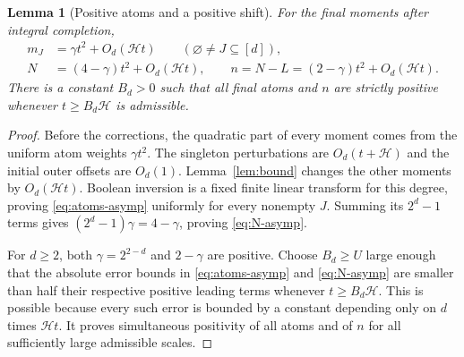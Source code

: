 \documentclass[11pt,a4paper]{article}
\newtheorem{lemma}[theorem]{Lemma}
\theoremstyle{definition}
\newcommand{\htf}{\mathcal H}
\newcommand{\wt}{\gamma}
\begin{document}
\begin{lemma}[Positive atoms and a positive shift]\label{lem:positive}
For the final moments after integral completion,
\begin{align}
 m_J&=\wt t^2+O_d(\htf t)\qquad(\varnothing\ne J\subseteq[d]),
     \label{eq:atoms-asymp}\\
 N&=(4-\wt)t^2+O_d(\htf t),\qquad
 n=N-L=(2-\wt)t^2+O_d(\htf t).\label{eq:N-asymp}
\end{align}
There is a constant $B_d>0$ such that all final atoms and $n$ are
strictly positive whenever $t\ge B_d\htf$ is admissible.
\end{lemma}
\begin{proof}
Before the corrections, the quadratic part of every moment comes from
the uniform atom weights $\wt t^2$. The singleton perturbations are
$O_d(t+\htf)$ and the initial outer offsets are $O_d(1)$.
Lemma~\ref{lem:bound} changes the other moments by
$O_d(\htf t)$. Boolean inversion is a fixed finite linear transform
for this degree, proving \eqref{eq:atoms-asymp} uniformly for every
nonempty $J$. Summing its $2^d-1$ terms gives
$(2^d-1)\wt=4-\wt$, proving \eqref{eq:N-asymp}.

For $d\ge2$, both $\wt=2^{2-d}$ and $2-\wt$ are positive.
Choose $B_d\ge U$ large enough that the absolute error bounds in
\eqref{eq:atoms-asymp} and \eqref{eq:N-asymp} are smaller than half
their respective positive leading terms whenever $t\ge B_d\htf$.
This is possible because every such error is bounded by a constant
depending only on $d$ times $\htf t$. It proves simultaneous positivity
of all atoms and of $n$ for all sufficiently large admissible scales.
\end{proof}
\end{document}
